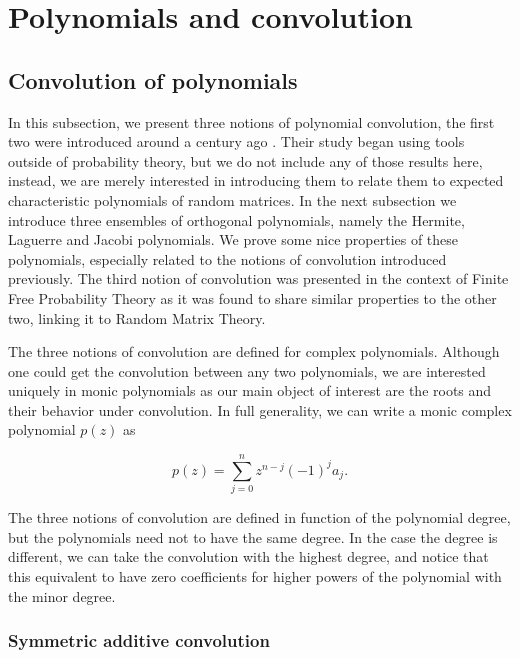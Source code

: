 \section{Polynomials and convolution}

\subsection{Convolution of polynomials}

In this subsection, we present three notions of polynomial convolution, the first two were introduced around a century ago \cite{walsh1922location} \cite{szeg1939orthogonal}. Their study began using tools outside of probability theory, but we do not include any of those results here, instead, we are merely interested in introducing them to relate them to expected characteristic polynomials of random matrices. In the next subsection we introduce three ensembles of orthogonal polynomials, namely the Hermite, Laguerre and Jacobi polynomials. We prove some nice properties of these polynomials, especially related to the notions of convolution introduced previously.  The third notion of convolution was presented in the context of Finite Free Probability Theory \cite{article:finitefree} as it was found to share similar properties to the other two, linking it to Random Matrix Theory.

The three notions of convolution are defined for complex polynomials. Although one could get the convolution between any two polynomials, we are interested uniquely in monic polynomials as our main object of interest are the roots and their behavior under convolution. In full generality, we can write a monic complex polynomial $p(z)$ as

\begin{equation*}
    p(z) = \sum_{j=0}^n z^{n-j}(-1)^{j}a_j.
\end{equation*}

The three notions of convolution are defined in function of the polynomial degree, but the polynomials need not to have the same degree. In the case the degree is different, we can take the convolution with the highest degree, and notice that this equivalent to have zero coefficients for higher powers of the polynomial with the minor degree.

\subsubsection{Symmetric additive convolution}

